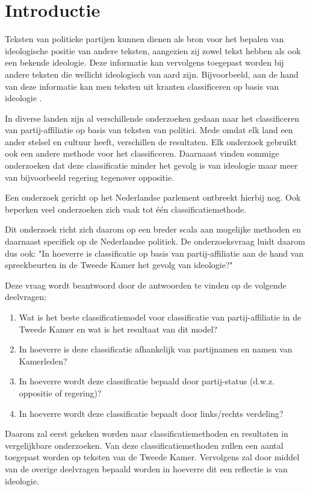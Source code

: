 \section{Introductie}
\label{sec:intro}
Teksten van politieke partijen kunnen dienen als bron voor het bepalen van ideologische positie van andere teksten, aangezien zij zowel tekst hebben als ook een bekende ideologie. Deze informatie kan vervolgens toegepast worden bij andere teksten die wellicht ideologisch van aard zijn. Bijvoorbeeld, aan de hand van deze informatie kan men teksten uit kranten classificeren op basis van ideologie \cite{DBLP:journals/corr/Biessmann16,Hirst_textto}.\par
In diverse landen zijn al verschillende onderzoeken gedaan naar het classificeren van partij-affiliatie op basis van teksten van politici\cite{Ferreira2016UsingTT,DBLP:journals/corr/Biessmann16}. Mede omdat elk land een ander stelsel en cultuur heeft, verschillen de resultaten. Elk onderzoek gebruikt ook een andere methode voor het classificeren. Daarnaast vinden sommige onderzoeken dat deze classificatie minder het gevolg is van ideologie maar meer van bijvoorbeeld regering tegenover oppositie.\cite{Hirst_textto}\par
Een onderzoek gericht op het Nederlandse parlement ontbreekt hierbij nog. Ook beperken veel onderzoeken zich vaak tot één classificatiemethode.\par
Dit onderzoek richt zich daarom op een breder scala aan mogelijke methoden en daarnaast specifiek op de Nederlandse politiek. De onderzoeksvraag luidt daarom dus ook: "In hoeverre is classificatie op basis van partij-affiliatie aan de hand van spreekbeurten in de Tweede Kamer het gevolg van ideologie?"\par
Deze vraag wordt beantwoord door de antwoorden te vinden op de volgende deelvragen:
\begin{enumerate}
    \item Wat is het beste classificatiemodel voor classificatie van partij-affiliatie in de Tweede Kamer en wat is het resultaat van dit model?
    \item In hoeverre is deze classificatie afhankelijk van partijnamen en namen van Kamerleden?
    \item In hoeverre wordt deze classificatie bepaald door partij-status (d.w.z. oppositie of regering)?
    \item In hoeverre wordt deze classificatie bepaalt door links/rechts verdeling?
\end{enumerate}
Daarom zal eerst gekeken worden naar classificatiemethoden en resultaten in vergelijkbare onderzoeken. Van deze classificatiemethoden zullen een aantal toegepast worden op teksten van de Tweede Kamer. Vervolgens zal door middel van de overige deelvragen bepaald worden in hoeverre dit een reflectie is van ideologie.


